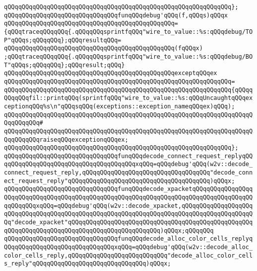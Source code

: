 \verb|qQQqqQQqqQQqqQQqqQQqqQQqqQQqqQQqqQQqqQQqqQQqqQQqqQQqqQQqqQQqqQQq};|\newline
\newline
\verb|qQQqqQQqqQQqqQQqqQQqqQQqqQQqqQQqfunqQQqdebug'qQQq(f,qQQqs)qQQqx|\newline
\verb|qQQqqQQqqQQqqQQqqQQqqQQqqQQqqQQqqQQqqQQqqQQqqQQq=|\newline
\verb|{qQQqtraceqQQqqQQq{.qQQqqQQqsprintfqQQq"wire_to_value::%s:qQQqdebug/TOP"qQQqs;qQQqqQQq};qQQqresultqQQq=|\newline
\verb|qQQqqQQqqQQqqQQqqQQqqQQqqQQqqQQqqQQqqQQqqQQqqQQq(fqQQqx)|\newline
\verb|;qQQqtraceqQQqqQQq{.qQQqqQQqsprintfqQQq"wire_to_value::%s:qQQqdebug/BOT"qQQqs;qQQqqQQq};qQQqresult;qQQq}|\newline
\verb|qQQqqQQqqQQqqQQqqQQqqQQqqQQqqQQqqQQqqQQqqQQqqQQqexceptqQQqex|\newline
\verb|qQQqqQQqqQQqqQQqqQQqqQQqqQQqqQQqqQQqqQQqqQQqqQQqqQQqqQQqqQQqqQQq=|\newline
\verb|qQQqqQQqqQQqqQQqqQQqqQQqqQQqqQQqqQQqqQQqqQQqqQQqqQQqqQQqqQQqqQQq{qQQqqQQqqQQqfil::printqQQq(sprintfqQQq"wire_to_value::%s:qQQqUncaughtqQQqexceptionqQQq%s\n"qQQqsqQQq(exceptions::exception_nameqQQqex)qQQq);|\newline
\verb|qQQqqQQqqQQqqQQqqQQqqQQqqQQqqQQqqQQqqQQqqQQqqQQqqQQqqQQqqQQqqQQqqQQqqQQqqQQqqQQq#|\newline
\verb|qQQqqQQqqQQqqQQqqQQqqQQqqQQqqQQqqQQqqQQqqQQqqQQqqQQqqQQqqQQqqQQqqQQqqQQqqQQqqQQqraiseqQQqexceptionqQQqex;|\newline
\verb|qQQqqQQqqQQqqQQqqQQqqQQqqQQqqQQqqQQqqQQqqQQqqQQqqQQqqQQqqQQqqQQq};|\newline
\newline
\verb|qQQqqQQqqQQqqQQqqQQqqQQqqQQqqQQqfunqQQqdecode_connect_request_replyqQQqqQQqqQQqqQQqqQQqqQQqqQQqqQQqqQQqqQQqxqQQq=qQQqdebug'qQQq(w2v::decode_connect_request_reply,qQQqqQQqqQQqqQQqqQQqqQQqqQQqqQQqqQQq"decode_connect_request_reply"qQQqqQQqqQQqqQQqqQQqqQQqqQQqqQQqqQQqqQQq)qQQqx;|\newline
\verb|qQQqqQQqqQQqqQQqqQQqqQQqqQQqqQQqfunqQQqdecode_xpacketqQQqqQQqqQQqqQQqqQQqqQQqqQQqqQQqqQQqqQQqqQQqqQQqqQQqqQQqqQQqqQQqqQQqqQQqqQQqqQQqqQQqqQQqqQQqqQQqxqQQq=qQQqdebug'qQQq(w2v::decode_xpacket,qQQqqQQqqQQqqQQqqQQqqQQqqQQqqQQqqQQqqQQqqQQqqQQqqQQqqQQqqQQqqQQqqQQqqQQqqQQqqQQqqQQqqQQqqQQq"decode_xpacket"qQQqqQQqqQQqqQQqqQQqqQQqqQQqqQQqqQQqqQQqqQQqqQQqqQQqqQQqqQQqqQQqqQQqqQQqqQQqqQQqqQQqqQQqqQQqqQQq)qQQqx;qQQqqQQq|\newline
\verb|qQQqqQQqqQQqqQQqqQQqqQQqqQQqqQQqfunqQQqdecode_alloc_color_cells_replyqQQqqQQqqQQqqQQqqQQqqQQqqQQqqQQqxqQQq=qQQqdebug'qQQq(w2v::decode_alloc_color_cells_reply,qQQqqQQqqQQqqQQqqQQqqQQqqQQq"decode_alloc_color_cells_reply"qQQqqQQqqQQqqQQqqQQqqQQqqQQqqQQq)qQQqx;|\newline
